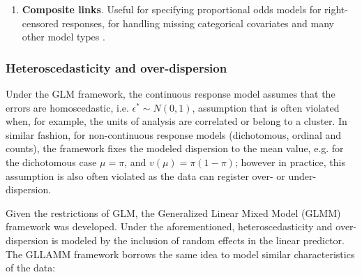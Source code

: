 \begin{enumerate}
\begin{enumerate}
		
		\item \textbf{Composite links}. Useful for specifying proportional odds models for right-censored responses, for handling missing categorical covariates and many other model types \citep{Skrondal_et_al_2004b}.
	\end{enumerate}
	
	

	


\end{enumerate}

\subsubsection{Heteroscedasticity and over-dispersion}

Under the GLM framework, the continuous response model assumes that the errors are homoscedastic, i.e. $\epsilon^{*} \sim N(0,1)$, assumption that is often violated when, for example, the units of analysis are correlated or belong to a cluster. In similar fashion, for non-continuous response models (dichotomous, ordinal and counts), the framework fixes the modeled dispersion to the mean value, e.g. for the dichotomous case $\mu = \pi$, and $v(\mu) = \pi (1-\pi)$; however in practice, this assumption is also often violated as the data can register over- or under-dispersion. 

Given the restrictions of GLM, the Generalized Linear Mixed Model (GLMM) framework was developed. Under the aforementioned, heteroscedasticity and over-dispersion is modeled by the inclusion of random effects in the linear predictor. The GLLAMM framework borrows the same idea to model similar characteristics of the data:

